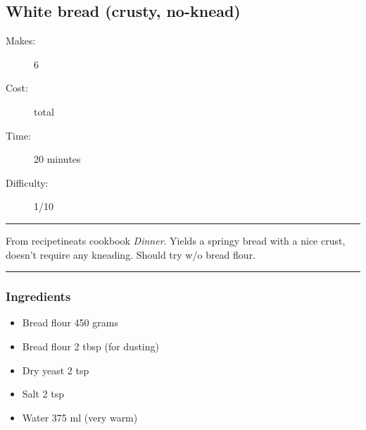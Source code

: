 \documentclass[]{article}
\begin{document}
\subsection*{\center\huge White bread (crusty, no-knead)}
\begin{description}
\item[Makes:] 6 
\item[Cost:]  total
\item[Time:] 20 minutes
\item[Difficulty:] 1/10
\end{description}
\vspace{0.2cm}\hrule\vspace{0.5cm}
\begin{adjustwidth}{0.5 cm}{0.5 cm}

From recipetineats cookbook \textit{Dinner}. Yields a springy bread with a nice crust, doesn't require any kneading. Should try w/o bread flour. \hfill{}\color{black}

\end{adjustwidth}
\vspace{0.5cm}\hrule
\subsubsection*{\Large Ingredients}
\begin{multicols}{2}
\begin{itemize}
 \item Bread flour \hfill 450 grams
 \item Bread flour \hfill 2 tbsp (for dusting)
 \item Dry yeast \hfill 2 tsp
 \item Salt \hfill 2 tsp
 \item Water \hfill 375 ml (very warm)
\end{itemize}
\end{multicols}
\end{document}

